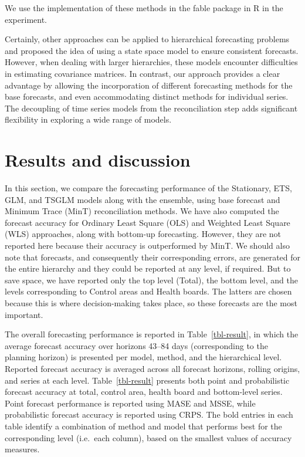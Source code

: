 \documentclass[
  authoryear,
  preprint,
  3p]{elsarticle}
\begin{document}
We use the implementation of these methods in the fable package in R in
the experiment.

Certainly, other approaches can be applied to hierarchical forecasting
problems \citet{pennings2017integrated} and \citet{villegas2018supply}
proposed the idea of using a state space model to ensure consistent
forecasts. However, when dealing with larger hierarchies, these models
encounter difficulties in estimating covariance matrices. In contrast,
our approach provides a clear advantage by allowing the incorporation of
different forecasting methods for the base forecasts, and even
accommodating distinct methods for individual series. The decoupling of
time series models from the reconciliation step adds significant
flexibility in exploring a wide range of models.

\hypertarget{sec-results}{%
\section{Results and discussion}\label{sec-results}}

In this section, we compare the forecasting performance of the
Stationary, ETS, GLM, and TSGLM models along with the ensemble, using
base forecast and Minimum Trace (MinT) reconciliation methods. We have
also computed the forecast accuracy for Ordinary Least Square (OLS) and
Weighted Least Square (WLS) approaches, along with bottom-up
forecasting. However, they are not reported here because their accuracy
is outperformed by MinT. We should also note that forecasts, and
consequently their corresponding errors, are generated for the entire
hierarchy and they could be reported at any level, if required. But to
save space, we have reported only the top level (Total), the bottom
level, and the levels corresponding to Control areas and Health boards.
The latters are chosen because this is where decision-making takes
place, so these forecasts are the most important.

The overall forecasting performance is reported in
Table~\ref{tbl-result}, in which the average forecast accuracy over
horizons 43--84 days (corresponding to the planning horizon) is
presented per model, method, and the hierarchical level. Reported
forecast accuracy is averaged across all forecast horizons, rolling
origins, and series at each level. Table~\ref{tbl-result} presents both
point and probabilistic forecast accuracy at total, control area, health
board and bottom-level series. Point forecast performance is reported
using MASE and MSSE, while probabilistic forecast accuracy is reported
using CRPS. The bold entries in each table identify a combination of
method and model that performs best for the corresponding level
(i.e.~each column), based on the smallest values of accuracy measures.
\end{document}
